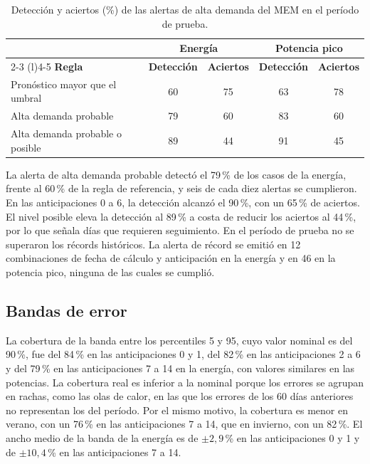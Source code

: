 \begin{table}[H]
	\centering
	\caption{Detección y aciertos (\%) de las alertas de alta demanda del MEM en el período de prueba.}
	\label{tab:resultados_alertas}
	\small
	\setlength{\tabcolsep}{4pt}
	\renewcommand{\arraystretch}{1.15}
	\begin{tabular*}{\textwidth}{@{\extracolsep{\fill}}lcccc@{}}
		\toprule
		& \multicolumn{2}{c}{\textbf{Energía}} & \multicolumn{2}{c}{\textbf{Potencia pico}} \\
		\cmidrule(lr){2-3} \cmidrule(l){4-5}
		\textbf{Regla} & \textbf{Detección} & \textbf{Aciertos} & \textbf{Detección} & \textbf{Aciertos} \\
		\midrule
		Pronóstico mayor que el umbral & 60 & 75 & 63 & 78 \\
		Alta demanda probable & 79 & 60 & 83 & 60 \\
		Alta demanda probable o posible & 89 & 44 & 91 & 45 \\
		\bottomrule
	\end{tabular*}
\end{table}

La alerta de alta demanda probable detectó el 79\,\% de los casos de la energía, frente al 60\,\% de la regla de referencia, y seis de cada diez alertas se cumplieron. En las anticipaciones 0 a 6, la detección alcanzó el 90\,\%, con un 65\,\% de aciertos. El nivel posible eleva la detección al 89\,\% a costa de reducir los aciertos al 44\,\%, por lo que señala días que requieren seguimiento. En el período de prueba no se superaron los récords históricos. La alerta de récord se emitió en 12 combinaciones de fecha de cálculo y anticipación en la energía y en 46 en la potencia pico, ninguna de las cuales se cumplió.

\subsection{Bandas de error}

La cobertura de la banda entre los percentiles 5 y 95, cuyo valor nominal es del 90\,\%, fue del 84\,\% en las anticipaciones 0 y 1, del 82\,\% en las anticipaciones 2 a 6 y del 79\,\% en las anticipaciones 7 a 14 en la energía, con valores similares en las potencias. La cobertura real es inferior a la nominal porque los errores se agrupan en rachas, como las olas de calor, en las que los errores de los 60 días anteriores no representan los del período. Por el mismo motivo, la cobertura es menor en verano, con un 76\,\% en las anticipaciones 7 a 14, que en invierno, con un 82\,\%. El ancho medio de la banda de la energía es de $\pm 2{,}9$\,\% en las anticipaciones 0 y 1 y de $\pm 10{,}4$\,\% en las anticipaciones 7 a 14.

